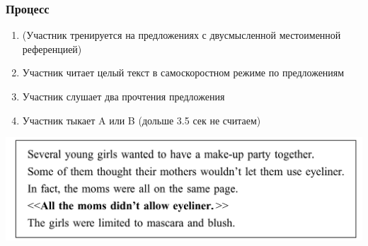 \documentclass{beamer}
\begin{document}
\begin{frame}
    \frametitle{Процесс}

    \begin{enumerate}
        \item (Участник тренируется на предложениях с двусмысленной местоименной референцией)
        \item Участник читает целый текст в самоскоростном режиме по предложениям
        \item Участник слушает два прочтения предложения
        \item Участник тыкает A или B (дольше 3.5 сек не считаем)
    \end{enumerate}

    \includegraphics[width=\textwidth]{images/p2 ex.png}
\end{frame}
\end{document}
